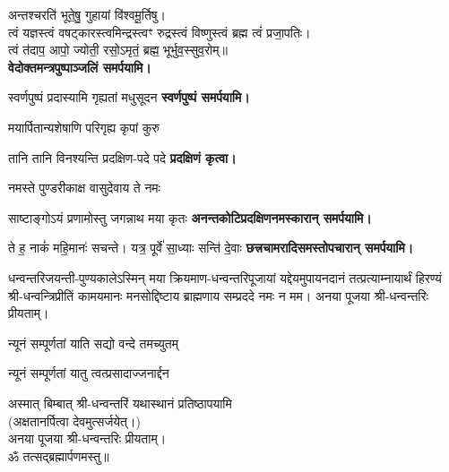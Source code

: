 \begin{center}
अन्तश्चरति॑ भूते॒षु॒ गुहायां वि॑श्वमू॒र्तिषु।\\
त्वं यज्ञस्त्वं वषट्कारस्त्वमिन्द्रस्त्वꣳ रुद्रस्त्वं विष्णुस्त्वं ब्रह्म त्वं॑ प्रजा॒पतिः।\\
त्वं त॑दाप॒ आपो॒ ज्योती॒ रसो॒ऽमृतं॒ ब्रह्म॒ भूर्भुव॒स्सुव॒रोम्‌॥\\

\textbf{\devAya{} वेदोक्तमन्त्रपुष्पाञ्जलिं समर्पयामि।}
\medskip

{स्वर्णपुष्पं प्रदास्यामि गृह्यतां मधुसूदन}
\textbf{\devAya{} स्वर्णपुष्पं समर्पयामि।}
\medskip

{मयार्पितान्यशेषाणि परिगृह्य कृपां कुरु}

{तानि तानि विनश्यन्ति प्रदक्षिण-पदे पदे}
\textbf{प्रदक्षिणं कृत्वा।}
\medskip

{नमस्ते पुण्डरीकाक्ष वासुदेवाय ते नमः}

{साष्टाङ्गोऽयं प्रणामोस्तु जगन्नाथ मया कृतः}
\textbf{\devAya{} अनन्तकोटिप्रदक्षिणनमस्कारान् समर्पयामि।}
 \medskip

{ते ह॒ नाकं॑ महि॒मानः॑ सचन्ते। यत्र॒ पूर्वे॑ सा॒ध्याः सन्ति॑ दे॒वाः}
\textbf{\devAya{} छत्त्रचामरादिसमस्तोपचारान् समर्पयामि।}
\medskip

\hiranyagarbha

धन्वन्तरिजयन्ती-पुण्यकालेऽस्मिन् मया क्रियमाण-धन्वन्तरिपूजायां यद्देयमुपायनदानं तत्प्रत्याम्नायार्थं
हिरण्यं श्री-धन्वन्त्रिप्रीतिं
कामयमानः मनसोद्दिष्टाय ब्राह्मणाय सम्प्रददे नमः न मम।
अनया पूजया श्री-धन्वन्तरिः प्रीयताम्।

{न्यूनं सम्पूर्णतां याति सद्यो वन्दे तमच्युतम्}

{न्यूनं सम्पूर्णतां यातु त्वत्प्रसादाज्जनार्द्दन}

अस्मात् बिम्बात् श्री-धन्वन्तरिं यथास्थानं प्रतिष्ठापयामि\\
(अक्षतानर्पित्वा देवमुत्सर्जयेत्।)\\
अनया पूजया श्री-धन्वन्तरिः प्रीयताम्।\\

ॐ तत्सद्ब्रह्मार्पणमस्तु॥



\closesection

\end{center}